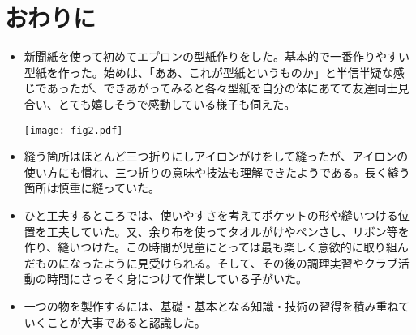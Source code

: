 \documentclass[a4paper,papersize,11pt]{jsarticle}
\begin{document}
\enlargethispage{1truecm}
\section{おわりに}
\begin{itemize}
\item \begin{minipage}[]{5.7truecm}
新聞紙を使って初めてエプロンの型紙作りをした。基本的で一番作りやすい型紙を作った。始めは、「ああ、これが型紙というものか」と半信半疑な感じであったが、できあがってみると各々型紙を自分の体にあてて友達同士見合い、とても嬉しそうで感動している様子も伺えた。
\end{minipage}\hfil
\begin{minipage}[]{7.5truecm}
\texttt{[image: fig2.pdf]}
\end{minipage}

\item 縫う箇所はほとんど三つ折りにしアイロンがけをして縫ったが、アイロンの使い方にも慣れ、三つ折りの意味や技法も理解できたようである。長く縫う箇所は慎重に縫っていた。

\item ひと工夫するところでは、使いやすさを考えてポケットの形や縫いつける位置を工夫していた。又、余り布を使ってタオルがけやペンさし、リボン等を作り、縫いつけた。この時間が児童にとっては最も楽しく意欲的に取り組んだものになったように見受けられる。そして、その後の調理実習やクラブ活動の時間にさっそく身につけて作業している子がいた。

\item 一つの物を製作するには、基礎・基本となる知識・技術の習得を積み重ねていくことが大事であると認識した。

\end{itemize}
\end{document}
